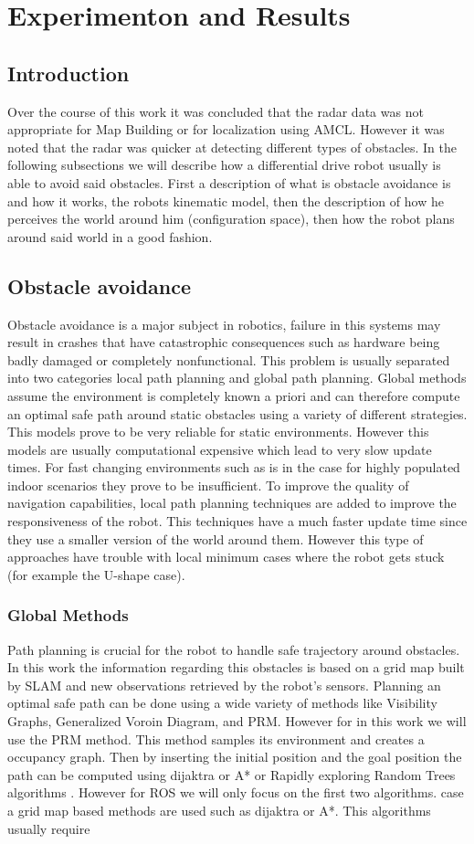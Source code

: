 \chapter{Experimenton and Results}


\section{Introduction}
Over the course of this work it was concluded that the radar data was not appropriate for Map Building or for localization using \ac{AMCL}. However it was noted that the radar was quicker   at detecting different types of obstacles. In the following subsections we will describe how a differential drive robot usually is able to avoid  said obstacles. 
First a description of what is obstacle avoidance is and how it  works, the robots kinematic model, then the description of how he perceives the world around him (configuration space), then how the robot plans around said world in a good fashion.
\section{Obstacle avoidance}
 Obstacle avoidance is a major subject in robotics, failure in this systems may result in crashes that have catastrophic consequences such as hardware being badly damaged or completely nonfunctional. This problem is usually separated into two categories local path planning and global path planning. 
 Global methods assume the environment is completely known a priori and can therefore compute an optimal safe path  around static obstacles using a variety of different strategies. This models prove to be very reliable for static environments. However this models are usually computational expensive which lead to very slow update times. For fast changing environments such as is in the case for highly populated indoor scenarios they prove to be insufficient. 
 To improve the quality of navigation capabilities, local path planning techniques are added to improve the responsiveness of the robot. This techniques have a much faster update time  since they use a smaller version of the world around them. However this type of approaches have trouble with local minimum cases where the robot gets stuck (for example the U-shape case).
\subsection{Global Methods}
Path planning is crucial for the robot to handle safe trajectory around obstacles. In this work the information regarding this obstacles is based on a grid map built by \ac{SLAM} and new observations retrieved by the robot's sensors.  Planning an optimal safe path can be done using a wide variety of methods like Visibility Graphs, Generalized Voroin Diagram, and \ac{PRM}. However for in this work we will use the \ac{PRM} method. This method samples its environment and creates a occupancy graph. Then by inserting the initial position and the goal position the path can be computed using dijaktra or A* or Rapidly exploring Random Trees algorithms . However for \ac{ROS} we will only focus on the first two algorithms.
case a grid map based methods are used such as dijaktra or A*. This algorithms usually require 
